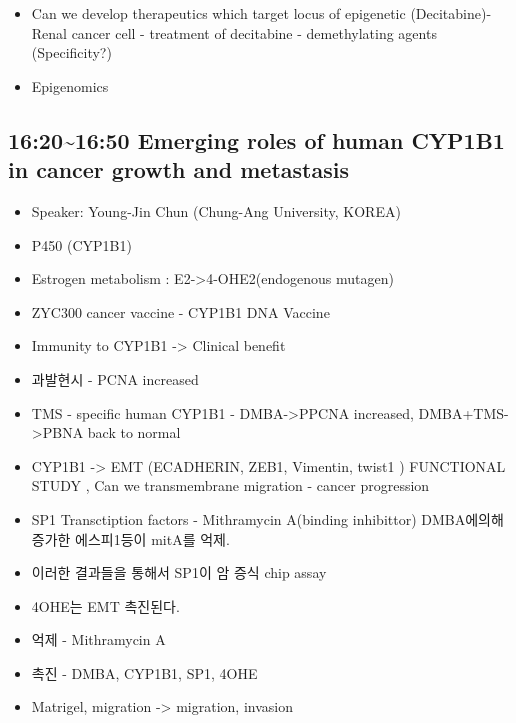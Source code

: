 \documentclass[]{book}
\providecommand{\tightlist}{%
  \setlength{\itemsep}{0pt}\setlength{\parskip}{0pt}}
\begin{document}
\begin{itemize}
\tightlist
\item
  Can we develop therapeutics which target locus of epigenetic
  (Decitabine)- Renal cancer cell - treatment of decitabine -
  demethylating agents (Specificity?)
\item
  Epigenomics
\end{itemize}

\subsection{16:20\textasciitilde{}16:50 Emerging roles of human CYP1B1
in cancer growth and
metastasis}\label{emerging-roles-of-human-cyp1b1-in-cancer-growth-and-metastasis}

\begin{itemize}
\tightlist
\item
  Speaker: Young-Jin Chun (Chung-Ang University, KOREA)
\item
  P450 (CYP1B1)
\item
  Estrogen metabolism : E2-\textgreater{}4-OHE2(endogenous mutagen)
\item
  ZYC300 cancer vaccine - CYP1B1 DNA Vaccine
\item
  Immunity to CYP1B1 -\textgreater{} Clinical benefit
\item
  과발현시 - PCNA increased
\item
  TMS - specific human CYP1B1 - DMBA-\textgreater{}PPCNA increased,
  DMBA+TMS-\textgreater{}PBNA back to normal
\item
  CYP1B1 -\textgreater{} EMT (ECADHERIN, ZEB1, Vimentin, twist1 )
  FUNCTIONAL STUDY , Can we transmembrane migration - cancer progression
\item
  SP1 Transctiption factors - Mithramycin A(binding inhibittor)
  DMBA에의해 증가한 에스피1등이 mitA를 억제.
\item
  이러한 결과들을 통해서 SP1이 암 증식 chip assay
\item
  4OHE는 EMT 촉진된다.
\item
  억제 - Mithramycin A
\item
  촉진 - DMBA, CYP1B1, SP1, 4OHE
\item
  Matrigel, migration -\textgreater{} migration, invasion
\end{itemize}

\subsubsection{}\label{section}
\end{document}

